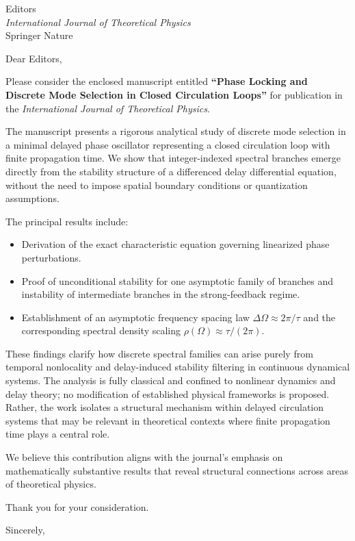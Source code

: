 \documentclass[a4paper,10pt]{letter}
\date{\today}
\begin{document}
    \begin{letter}{Editors\\
    \textit{International Journal of Theoretical Physics}\\
    Springer Nature}

\opening{Dear Editors,}

Please consider the enclosed manuscript entitled \textbf{“Phase Locking and Discrete Mode Selection in Closed Circulation Loops”} for publication in the \textit{International Journal of Theoretical Physics}.

The manuscript presents a rigorous analytical study of discrete mode selection in a minimal delayed phase oscillator representing a closed circulation loop with finite propagation time. We show that integer-indexed spectral branches emerge directly from the stability structure of a differenced delay differential equation, without the need to impose spatial boundary conditions or quantization assumptions.

The principal results include:

\begin{itemize}
    \item Derivation of the exact characteristic equation governing linearized phase perturbations.
    \item Proof of unconditional stability for one asymptotic family of branches and instability of intermediate branches in the strong-feedback regime.
    \item Establishment of an asymptotic frequency spacing law $\Delta\Omega \approx 2\pi/\tau$ and the corresponding spectral density scaling $\rho(\Omega) \approx \tau/(2\pi)$.
\end{itemize}

These findings clarify how discrete spectral families can arise purely from temporal nonlocality and delay-induced stability filtering in continuous dynamical systems. The analysis is fully classical and confined to nonlinear dynamics and delay theory; no modification of established physical frameworks is proposed. Rather, the work isolates a structural mechanism within delayed circulation systems that may be relevant in theoretical contexts where finite propagation time plays a central role.

We believe this contribution aligns with the journal’s emphasis on mathematically substantive results that reveal structural connections across areas of theoretical physics.

Thank you for your consideration.

\closing{Sincerely,}

    \end{letter}
\end{document}
